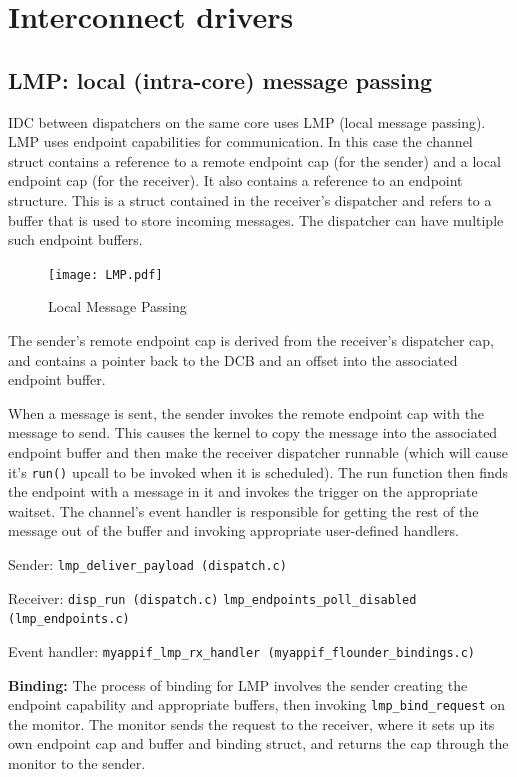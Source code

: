 \documentclass[a4paper,twoside]{report} %
\begin{document}
\chapter{Interconnect drivers}\label{cha:icds}

\section{LMP: local (intra-core) message passing}
\label{sec:lmp_icd}

IDC between dispatchers on the same core uses LMP (local message passing).  LMP
uses endpoint capabilities for communication.  In this case the channel struct
contains a reference to a remote endpoint cap (for the sender) and a local
endpoint cap (for the receiver). It also contains a reference to an endpoint
structure. This is a struct contained in the receiver's dispatcher and refers to
a buffer that is used to store incoming messages. The dispatcher can have
multiple such endpoint buffers.

\begin{figure}
  \begin{center}
    \texttt{[image: LMP.pdf]}
  \end{center}
  \caption{Local Message Passing}
  \label{fig:lmp}
\end{figure}


The sender's remote endpoint cap is derived from the receiver's dispatcher cap,
and contains a pointer back to the DCB and an offset into the associated
endpoint buffer.

When a message is sent, the sender invokes the remote endpoint cap with the
message to send. This causes the kernel to copy the message into the associated
endpoint buffer and then make the receiver dispatcher runnable (which will cause
it's \texttt{run()} upcall to be invoked when it is scheduled). The run function
then finds the endpoint with a message in it and invokes the trigger on the
appropriate waitset. The channel's event handler is responsible for getting the
rest of the message out of the buffer and invoking appropriate user-defined
handlers.

Sender: \texttt{lmp\_deliver\_payload (dispatch.c)}

Receiver: \texttt{disp\_run (dispatch.c)}
          \texttt{lmp\_endpoints\_poll\_disabled (lmp\_endpoints.c)}

Event handler: \texttt{myappif\_lmp\_rx\_handler (myappif\_flounder\_bindings.c)}

\textbf{Binding:} The process of binding for LMP involves the sender creating
the endpoint capability and appropriate buffers, then invoking
\texttt{lmp\_bind\_request} on the monitor. The monitor sends the request to the
receiver, where it sets up its own endpoint cap and buffer and binding struct,
and returns the cap through the monitor to the sender.
\end{document}

